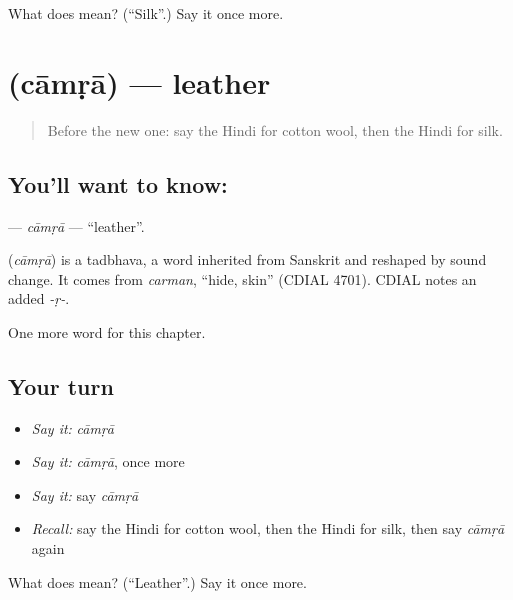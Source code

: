 \begin{tcolorbox}[breakable,colback=teal!4,colframe=teal!35!black,title={Before you move on}]
What does  mean? (\textquotedblleft{}Silk\textquotedblright{}.) Say it once more.
\end{tcolorbox}
\section[\texorpdfstring{\hi{चमड़ा} (cāmṛā)}{चमड़ा (cāmṛā)}]{ (cāmṛā) — leather}

\label{lesson:HI-C247-camra}



\begin{quote}
Before the new one: say the Hindi for cotton wool, then the Hindi for silk.
\end{quote}

\subsection*{You'll want to know: }
\textbf{} — \emph{cāmṛā} — \textquotedblleft{}leather\textquotedblright{}.

\begin{cousinweb}
\textbf{} (\emph{cāmṛā}) is a tadbhava, a word inherited from Sanskrit and reshaped by sound change. It comes from \emph{carman}, \textquotedblleft{}hide, skin\textquotedblright{} (CDIAL 4701). CDIAL notes an added \emph{-ṛ-}.
\end{cousinweb}

\begin{grammarlens}[title={What you've built}]
One more word for this chapter.
\end{grammarlens}

\subsection*{Your turn}
\begin{itemize}
\raggedright
  \item \emph{Say it:} \emph{cāmṛā}
  \item \emph{Say it:} \emph{cāmṛā}, once more
  \item \emph{Say it:} say \emph{cāmṛā}
  \item \emph{Recall:} say the Hindi for cotton wool, then the Hindi for silk, then say \emph{cāmṛā} again
\end{itemize}

\begin{tcolorbox}[breakable,colback=teal!4,colframe=teal!35!black,title={Before you move on}]
What does  mean? (\textquotedblleft{}Leather\textquotedblright{}.) Say it once more.
\end{tcolorbox}
